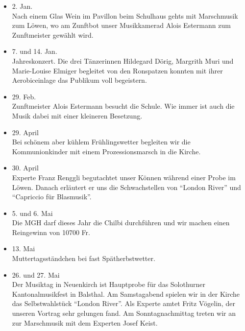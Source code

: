 \begin{history}


    \begin{itemize}

        \item[]2. Jan.\\
        Nach einem Glas Wein im Pavillon beim Schulhaus gehts mit Marschmusik
        zum Löwen, wo am Zunftbot unser Musikkamerad Alois Estermann zum
        Zunftmeister gewählt wird.

        \item[]7. und 14. Jan.\\
        Jahreskonzert. Die drei Tänzerinnen Hildegard Dörig, Margrith Muri und
        Marie-Louise Elmiger begleitet von den Ronspatzen konnten mit ihrer
        Aerobiceinlage das Publikum voll begeistern.

        \item[]29. Feb.\\
        Zunftmeister Alois Estermann besucht die Schule. Wie immer ist auch die
        Musik dabei mit einer kleineren Besetzung.

        \item[]29. April\\
        Bei schönem aber kühlem Frühlingswetter begleiten wir die
        Kommunionkinder mit einem Prozessionsmarsch in die Kirche.

        \item[]30. April\\
        Experte Franz Renggli begutachtet unser Können während einer Probe im
        Löwen. Danach erläutert er uns die Schwachstellen von \enquote{London
            River} und \enquote{Capriccio für Blasmusik}.

        \item[]5. und 6. Mai\\
        Die MGH darf dieses Jahr die Chilbi durchführen und wir machen einen
        Reingewinn von 10700 Fr.

        \item[]13. Mai\\
        Muttertagsständchen bei fast Spätherbstwetter.

        \item[]26. und 27. Mai\\
        Der Musiktag in Neuenkirch ist Hauptprobe für das Solothurner
        Kantonalmusikfest in Balsthal. Am Samstagabend spielen wir in der Kirche
        das Selbstwahlstück \enquote{London River}. Als Experte amtet Fritz
        Vögelin, der unseren Vortrag sehr gelungen fand. Am Sonntagnachmittag
        treten wir an zur Marschmusik mit dem Experten Josef Keist.


\end{itemize}
\end{history}
